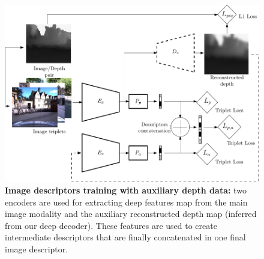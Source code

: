 \begin{figure}
	\centering
		
	\includegraphics[width=\linewidth]{preliminary/our_method_training}
	
	\caption[Image descriptors training with auxiliary depth data]{\label{fig:our_method} \textbf{Image descriptors training with auxiliary depth data:} two encoders are used for extracting deep features map from the main image modality and the auxiliary reconstructed depth map (inferred from our deep decoder). These features are used to create intermediate descriptors that are finally concatenated in one final image descriptor.}
\end{figure}
	